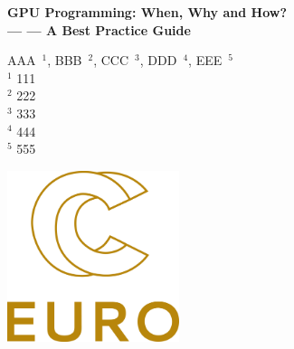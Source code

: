 \documentclass[article, a4paper, 11pt, amsmath, amssymb]{revtex4-1}
\begin{document}
\setpagewiselinenumbers
\modulolinenumbers[5]



\begin{titlepage}
    \begin{center}
        \vspace*{1cm}
            
        \Huge
        \textbf{\LARGE{GPU Programming: When, Why and How?}}\\
        \vspace{0.0cm}
        \textbf{\Large{--- --- A Best Practice Guide}}

        \vspace{0.3cm}
            
        \textrm{\large{AAA~$^{1}$, BBB~$^{2}$, CCC~$^{3}$, DDD~$^{4}$, EEE~$^{5}$}}\\
        \vspace{1.0cm}
        $^1$ 111\\
        $^2$ 222\\
        $^3$ 333\\
        $^4$ 444\\
        $^5$ 555
     
        \vspace{2.0cm}
            
        \includegraphics[height=5cm]{fig_logo_history/eurocc.png}
            
    \end{center}
\end{titlepage}
\end{document}
